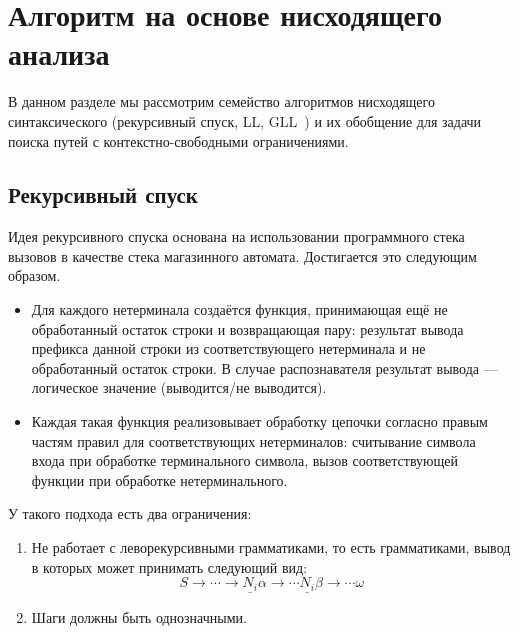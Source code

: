 \chapter{Алгоритм на основе нисходящего анализа}

В данном разделе мы рассмотрим семейство алгоритмов нисходящего синтаксического (рекурсивный спуск, LL, GLL~\cite{Scott:2010:GP:1860132.1860320,10.1007/978-3-662-46663-6_5}) и их обобщение для задачи поиска путей с контекстно-свободными ограничениями.


\section{Рекурсивный спуск}

Идея рекурсивного спуска основана на использовании программного стека вызовов в качестве стека магазинного автомата. Достигается это следующим образом.
\begin{itemize}
  \item Для каждого нетерминала создаётся функция, принимающая ещё не обработанный остаток строки и возвращающая пару: результат вывода префикса данной строки из соответствующего нетерминала и не обработанный остаток строки. В случае распознавателя результат вывода --- логическое значение (выводится/не выводится).
  \item Каждая такая функция реализовывает обработку цепочки согласно правым частям правил для соответствующих нетерминалов: считывание символа входа при обработке терминального символа, вызов соответствующей функции при обработке нетерминального.
\end{itemize}

У такого подхода есть два ограничения:
\begin{enumerate}
  \item Не работает с леворекурсивными грамматиками, то есть грамматиками, вывод в которых может принимать следующий вид:
  $$
  S \to \cdots \to \underline{N_i} \alpha \to \cdots \underline{N_i} \beta \to \cdots \omega
  $$
  \item Шаги должны быть однозначными.
\end{enumerate}

